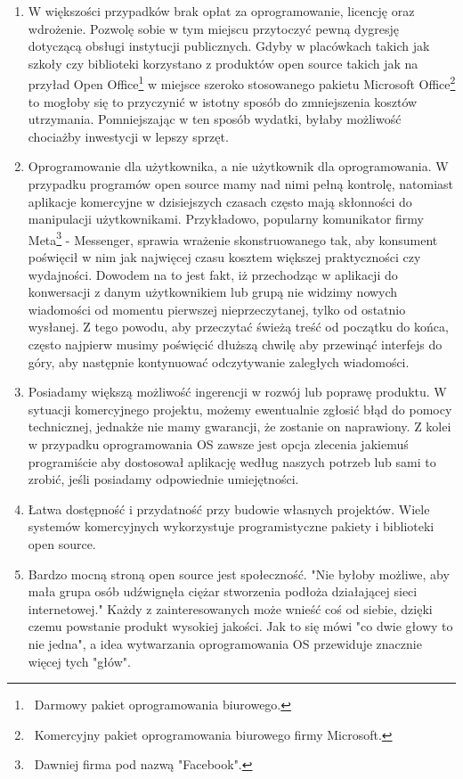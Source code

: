 \documentclass{article}
\begin{document}
\begin{enumerate}
    \item W większości przypadków brak opłat za oprogramowanie, licencję oraz wdrożenie. Pozwolę sobie w tym miejscu przytoczyć pewną dygresję dotyczącą obsługi instytucji publicznych. Gdyby w placówkach takich jak szkoły czy biblioteki korzystano z produktów open source takich jak na przyład Open Office\footnote{\, Darmowy pakiet oprogramowania biurowego.} w miejsce szeroko stosowanego pakietu Microsoft Office\footnote{\, Komercyjny pakiet oprogramowania biurowego firmy Microsoft.} to mogłoby się to przyczynić w istotny sposób do zmniejszenia kosztów utrzymania. Pomniejszając w ten sposób wydatki, byłaby możliwość chociażby inwestycji w lepszy sprzęt.
    
    \item Oprogramowanie dla użytkownika, a nie użytkownik dla oprogramowania. W przypadku programów open source mamy nad nimi pełną kontrolę, natomiast aplikacje komercyjne w dzisiejszych czasach często mają skłonności do manipulacji użytkownikami. Przykładowo, popularny komunikator firmy Meta\footnote{\, Dawniej firma pod nazwą "Facebook".} - Messenger, sprawia wrażenie skonstruowanego tak, aby konsument poświęcił w nim jak najwięcej czasu kosztem większej praktyczności czy wydajności. Dowodem na to jest fakt, iż przechodząc w aplikacji do konwersacji z danym użytkownikiem lub grupą nie widzimy nowych wiadomości od momentu pierwszej nieprzeczytanej, tylko od ostatnio wysłanej. Z tego powodu, aby przeczytać świeżą treść od początku do końca, często najpierw musimy poświęcić dłuższą chwilę aby przewinąć interfejs do góry, aby następnie kontynuować odczytywanie zaległych wiadomości.
    
    \item Posiadamy większą możliwość ingerencji w rozwój lub poprawę produktu. W sytuacji komercyjnego projektu, możemy ewentualnie zgłosić błąd do pomocy technicznej, jednakże nie mamy gwarancji, że zostanie on naprawiony. Z kolei w przypadku oprogramowania OS zawsze jest opcja zlecenia jakiemuś programiście aby dostosował aplikację według naszych potrzeb lub sami to zrobić, jeśli posiadamy odpowiednie umiejętności.
    
    \item Łatwa dostępność i przydatność przy budowie własnych projektów. Wiele systemów komercyjnych wykorzystuje programistyczne pakiety i biblioteki open source.
    
    \item Bardzo mocną stroną open source jest społeczność. "Nie byłoby możliwe, aby mała grupa osób udźwignęła ciężar stworzenia podłoża działającej sieci internetowej\cite{Kotula}." Każdy z zainteresowanych może wnieść coś od siebie, dzięki czemu powstanie produkt wysokiej jakości. Jak to się mówi "co dwie głowy to nie jedna", a idea wytwarzania oprogramowania OS przewiduje znacznie więcej tych "głów".
    

\end{enumerate}
\end{document}
